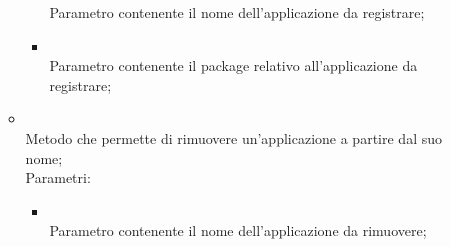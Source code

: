 \begin{itemize}
\begin{itemize}
\begin{itemize}
			Parametro contenente il nome dell'applicazione da registrare;
			\item {} \\
			Parametro contenente il package relativo all'applicazione da registrare;
		\end{itemize}
		\item[]  \\
		Metodo che permette di rimuovere un'applicazione a partire dal suo nome;\\
		Parametri:
		\begin{itemize}
			\item {} \\
			Parametro contenente il nome dell'applicazione da rimuovere;
		\end{itemize}
	\end{itemize}
\end{itemize}

